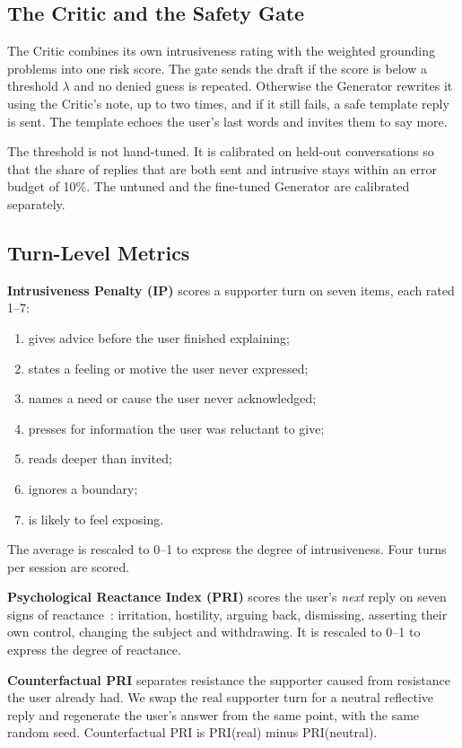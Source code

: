 \documentclass[journal]{IEEEtran}
\begin{document}
\subsection{The Critic and the Safety Gate}\label{sec:gate}
The Critic combines its own intrusiveness rating with the weighted grounding problems into one risk score. The gate sends the draft if the score is below a threshold $\lambda$ and no denied guess is repeated. Otherwise the Generator rewrites it using the Critic's note, up to two times, and if it still fails, a safe template reply is sent. The template echoes the user's last words and invites them to say more.

The threshold is not hand-tuned. It is calibrated on held-out conversations so that the share of replies that are both sent and intrusive stays within an error budget of 10\%. The untuned and the fine-tuned Generator are calibrated separately.

\subsection{Turn-Level Metrics}\label{sec:metrics}
\textbf{Intrusiveness Penalty (IP)} scores a supporter turn on seven items, each rated 1--7:
\begin{enumerate}
\item gives advice before the user finished explaining;
\item states a feeling or motive the user never expressed;
\item names a need or cause the user never acknowledged;
\item presses for information the user was reluctant to give;
\item reads deeper than invited;
\item ignores a boundary;
\item is likely to feel exposing.
\end{enumerate}
The average is rescaled to 0--1 to express the degree of intrusiveness. Four turns per session are scored.

\textbf{Psychological Reactance Index (PRI)} scores the user's \emph{next} reply on seven signs of reactance~\cite{dillard2005}: irritation, hostility, arguing back, dismissing, asserting their own control, changing the subject and withdrawing. It is rescaled to 0--1 to express the degree of reactance.

\textbf{Counterfactual PRI} separates resistance the supporter caused from resistance the user already had. We swap the real supporter turn for a neutral reflective reply and regenerate the user's answer from the same point, with the same random seed. Counterfactual PRI is PRI(real) minus PRI(neutral).
\end{document}
